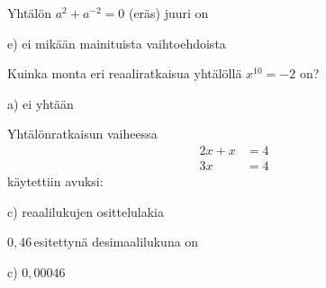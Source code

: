 \begin{tehtava}
Yhtälön $a^2+a^{-2}=0$ (eräs) juuri on
	\begin{vastaus}
e) ei mikään mainituista vaihtoehdoista
	\end{vastaus}
\end{tehtava}

\begin{tehtava}
Kuinka monta eri reaaliratkaisua yhtälöllä $x^{10}=-2$ on?
	\begin{vastaus}
a) ei yhtään
	\end{vastaus}
\end{tehtava}

\begin{tehtava}
Yhtälönratkaisun vaiheessa
\begin{align*}
2x+x&=4 \\
3x&=4
\end{align*}
käytettiin avuksi:
	\begin{vastaus}
	c) reaalilukujen osittelulakia
	\end{vastaus}
\end{tehtava}

%
%	
%
%
%	
%
%
%	

\begin{tehtava}
$0,46$\,\permil\;esitettynä desimaalilukuna on
	\begin{vastaus}
	c) $0,00046$
	\end{vastaus}
\end{tehtava}

